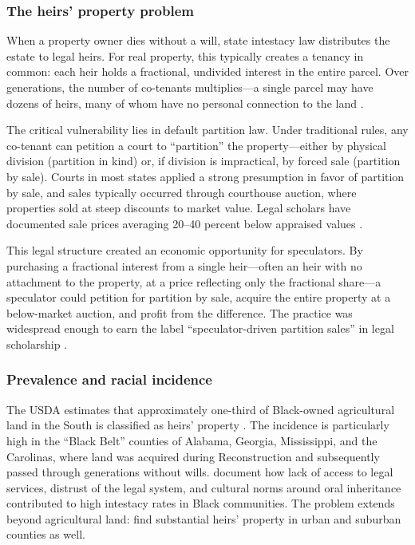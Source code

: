 \documentclass[12pt]{article}
\begin{document}
\subsubsection*{The heirs' property problem} When a property owner dies without a will, state intestacy law distributes the estate to legal heirs. For real property, this typically creates a tenancy in common: each heir holds a fractional, undivided interest in the entire parcel. Over generations, the number of co-tenants multiplies---a single parcel may have dozens of heirs, many of whom have no personal connection to the land \citep{mitchell2005}.

The critical vulnerability lies in default partition law. Under traditional rules, any co-tenant can petition a court to ``partition'' the property---either by physical division (partition in kind) or, if division is impractical, by forced sale (partition by sale). Courts in most states applied a strong presumption in favor of partition by sale, and sales typically occurred through courthouse auction, where properties sold at steep discounts to market value. Legal scholars have documented sale prices averaging 20--40 percent below appraised values \citep{rivers2007, mitchell2019}.

This legal structure created an economic opportunity for speculators. By purchasing a fractional interest from a single heir---often an heir with no attachment to the property, at a price reflecting only the fractional share---a speculator could petition for partition by sale, acquire the entire property at a below-market auction, and profit from the difference. The practice was widespread enough to earn the label ``speculator-driven partition sales'' in legal scholarship \citep{mitchell2005}.

\subsubsection*{Prevalence and racial incidence} The USDA estimates that approximately one-third of Black-owned agricultural land in the South is classified as heirs' property \citep{gilbert2002}. The incidence is particularly high in the ``Black Belt'' counties of Alabama, Georgia, Mississippi, and the Carolinas, where land was acquired during Reconstruction and subsequently passed through generations without wills. \citet{balvanz2011} document how lack of access to legal services, distrust of the legal system, and cultural norms around oral inheritance contributed to high intestacy rates in Black communities. The problem extends beyond agricultural land: \citet{deaton2022} find substantial heirs' property in urban and suburban counties as well.
\end{document}
